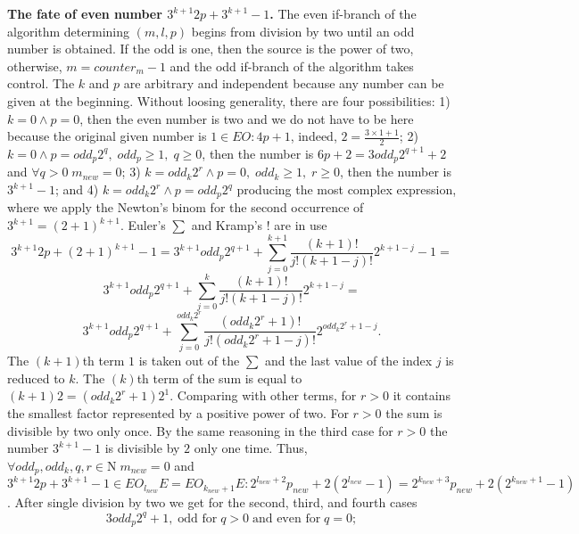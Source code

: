\documentclass{article}
\begin{document}
\textbf{The fate of even number $3^{k+1}2p + 3^{k+1} - 1$.} The even if-branch of the algorithm determining $(m, l, p)$ begins from division by two until an odd number is obtained. If the odd is one, then the source is the power of two, otherwise, $m = counter_{m} - 1$ and the odd if-branch of the algorithm takes control. The $k$ and $p$ are arbitrary and independent because any number can be given at the beginning. Without loosing generality, there are four possibilities: 1) $k = 0 \wedge p = 0$, then the even number is two and we do not have to be here because the original given number is $1 \in EO:4p+1$, indeed, $2 = \frac{3 \times 1 + 1}{2}$; 2) $k = 0 \wedge p = odd_p2^q, \; odd_p \geq 1, \; q \geq 0$, then the number is $6p + 2 = 3odd_p2^{q+1}+2$ and $\forall q>0 \; m_{new} = 0$; 3) $k = odd_k2^r \wedge p = 0, \; odd_k \geq 1, \; r \geq 0$, then the number is $3^{k+1} - 1$; and 4) $k = odd_k2^r \wedge p = odd_p2^q$ producing the most complex expression, where we apply the Newton's binom \cite{korn} for the second occurrence of $3^{k+1} = (2 + 1)^{k + 1}$. Euler's $\sum$ and Kramp's $!$ are in use
\begin{displaymath}
3^{k+1}2p + (2+1)^{k+1} - 1 =3^{k+1}odd_p 2^{q+1} + \sum_{j=0}^{k+1}\frac{(k+1)!}{j!(k+1-j)!}2^{k+1-j} - 1 =
\end{displaymath}
\begin{displaymath}
3^{k+1}odd_p 2^{q+1} + \sum_{j=0}^{k}\frac{(k+1)!}{j!(k+1-j)!}2^{k+1-j} =
\end{displaymath}
\begin{displaymath}
3^{k+1}odd_p 2^{q+1} + \sum_{j=0}^{odd_k 2^r}\frac{(odd_k 2^r+1)!}{j!(odd_k 2^r+1-j)!}2^{odd_k 2^r+1-j}.
\end{displaymath}
The $(k+1)$th term $1$ is taken out of the $\sum$ and the last value of the index $j$ is reduced to $k$. The $(k)$th term of the sum is equal to $(k + 1)2 = (odd_k 2^r + 1)2^1$. Comparing with other terms, for $r>0$ it contains the smallest factor represented by a positive power of two. For $r>0$ the sum is divisible by two only once. By the same reasoning in the third case for $r>0$ the number $3^{k+1}-1$ is divisible by $2$ only one time. Thus, $\forall odd_p, odd_k, q,r \in \mathrm{N} \; m_{new}=0$ and $3^{k+1}2p + 3^{k+1} - 1 \in EO_{l_{new}}E=EO_{k_{new}+1}E:2^{l_{new}+2}p_{new}+2(2^{l_{new}}-1)=2^{k_{new}+3}p_{new}+2(2^{k_{new}+1}-1)$.
After single division by two we get for the second, third, and fourth cases
\begin{displaymath}
3odd_p2^{q}+1, \; \textrm{odd for} \; q > 0 \; \textrm{and even for} \; q = 0;
\end{displaymath}
\end{document}
